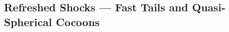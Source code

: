 \documentclass[twocolumn]{aastex62}
\newcommand{\tW}{\ensuremath{t_{\mathrm{w}}}}
\newcommand{\tb}{\ensuremath{t_{\mathrm{b}}}}
\newcommand{\thobs}{\ensuremath{\theta_{\mathrm{obs}}}}
\newcommand{\thW}{\ensuremath{\theta_{\mathrm{w}}}}
\newcommand{\thC}{\ensuremath{\theta_{\mathrm{c}}}}
\newcommand{\geff}{\ensuremath{g_{\mathrm{eff}}}}
\begin{document}

%

%
%


\subsection{Refreshed Shocks --- Fast Tails and Quasi-Spherical Cocoons}\label{subsec:refreshedShocks}
\end{document}

